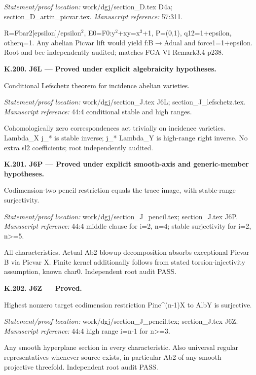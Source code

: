 \par\emph{Statement/proof location:} work/dgj/section\_D.tex D4a; section\_D\_artin\_picvar.tex.
\emph{Manuscript reference:} 57:311.
\par R=Fbar2[epsilon]/epsilon\ensuremath{{}^2}, E0=F0:y\ensuremath{{}^2}+xy=x\ensuremath{{}^3}+1, P=(0,1), q12=1+epsilon, otherq=1. Any abelian Picvar lift would yield f:B\ensuremath{\to}Adual and force1=1+epsilon. Root and bce independently audited; matches FGA VI Remark3.4 p238.
\par\medskip\noindent\textbf{K.200. J6L --- Proved under explicit algebraicity hypotheses.}\par
Conditional Lefschetz theorem for incidence abelian varieties.
\par\emph{Statement/proof location:} work/dgj/section\_J.tex J6L; section\_J\_lefschetz.tex.
\emph{Manuscript reference:} 44:4 conditional stable and high ranges.
\par Cohomologically zero correspondences act trivially on incidence varieties. Lambda\_X j\_* is stable inverse; j\_* Lambda\_Y is high-range right inverse. No extra sl2 coefficients; root independently audited.
\par\medskip\noindent\textbf{K.201. J6P --- Proved under explicit smooth-axis and generic-member hypotheses.}\par
Codimension-two pencil restriction equals the trace image, with stable-range surjectivity.
\par\emph{Statement/proof location:} work/dgj/section\_J\_pencil.tex; section\_J.tex J6P.
\emph{Manuscript reference:} 44:4 middle clause for i=2, n=4; stable surjectivity for i=2, n>=5.
\par All characteristics. Actual Ab2 blowup decomposition absorbs exceptional Picvar B via Picvar X. Finite kernel additionally follows from stated torsion-injectivity assumption, known char0. Independent root audit PASS.
\par\medskip\noindent\textbf{K.202. J6Z --- Proved.}\par
Highest nonzero target codimension restriction Pinc\textasciicircum{}(n-1)X to AlbY is surjective.
\par\emph{Statement/proof location:} work/dgj/section\_J\_pencil.tex; section\_J.tex J6Z.
\emph{Manuscript reference:} 44:4 high range i=n-1 for n>=3.
\par Any smooth hyperplane section in every characteristic. Also universal regular representatives whenever source exists, in particular Ab2 of any smooth projective threefold. Independent root audit PASS.
